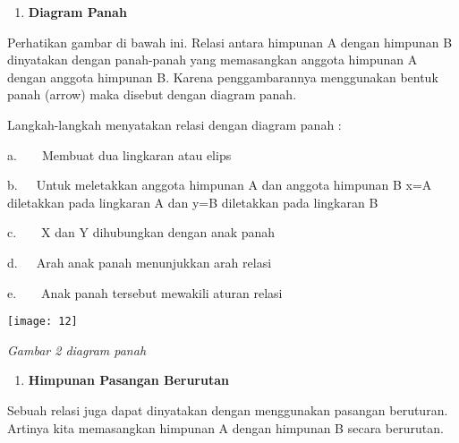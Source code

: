\documentclass[11pt,fleqn]{book} %
\begin{document}
\begin{enumerate}
\item  \textbf{Diagram Panah}
\end{enumerate}

\noindent 

\noindent Perhatikan gambar di bawah ini. Relasi antara himpunan A dengan himpunan B dinyatakan dengan panah-panah yang memasangkan anggota himpunan A dengan anggota himpunan B. Karena penggambarannya menggunakan bentuk panah (arrow) maka disebut dengan diagram panah.

\noindent 

\noindent Langkah-langkah menyatakan relasi dengan diagram panah :

\noindent 

\noindent a.~~~~Membuat dua lingkaran atau elips

\noindent b.~~~Untuk meletakkan anggota himpunan A dan anggota himpunan B x=A diletakkan pada lingkaran A dan y=B diletakkan pada lingkaran B

\noindent c.~~~~X dan Y dihubungkan dengan anak panah

\noindent d.~~~Arah anak panah menunjukkan arah relasi

\noindent e.~~~~Anak panah tersebut mewakili aturan relasi

\noindent 

\begin{center}
\noindent \texttt{[image: 12]}
\end{center}

\noindent \textit{Gambar 2 diagram panah}

\noindent \textit{}

\begin{enumerate}
\item \textit{ }\textbf{Himpunan Pasangan Berurutan}
\end{enumerate}

\noindent 

\noindent Sebuah relasi juga dapat dinyatakan dengan menggunakan pasangan beruturan. Artinya kita memasangkan himpunan A dengan himpunan B secara berurutan.

\noindent 

\noindent 

\noindent 

\noindent 

\noindent 

\noindent 
\end{document}
